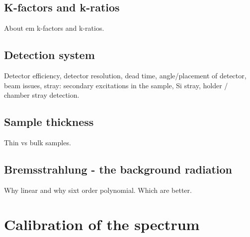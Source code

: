 %
% 
\subsection{K-factors and k-ratios}
\label{sec:theory:empirical:kfactors}
About em k-factors and k-ratios.





\subsection{Detection system}
\label{sec:theory:empirical:detectionsystem}
Detector efficiency, detector resolution, dead time, angle/placement of detector, beam issues, stray: secondary excitations in the sample, Si stray, holder / chamber stray detection.

\subsection{Sample thickness}
\label{sec:theory:empirical:samplethickness}
Thin vs bulk samples.



%
%
\subsection{Bremsstrahlung - the background radiation}
\label{sec:theory:empirical:background}
Why linear and why sixt order polynomial. Which are better.



%
%
\section{Calibration of the spectrum}
\label{sec:theory:calibration}


